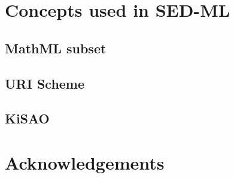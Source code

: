 \documentclass[pdftex,rgb,dvipsnames,svgnames,hyperref,table]{article}
\begin{document}

\tableofcontents
\newpage


  
  \newpage
  
  \newpage
  \section{Concepts used in SED-ML}

  \subsection{MathML subset}
  

  \subsection{URI Scheme}  
  
  
  \subsection{KiSAO}
  

  

  

  

  

\section*{Acknowledgements}

\end{document}

